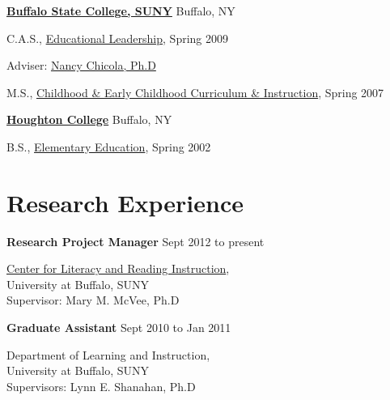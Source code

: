 \href{http://www.buffalostate.edu/}{\textbf{Buffalo State College, SUNY}}
Buffalo, NY
\begin{outerlist}

\item[] C.A.S.,
        \href{http://www.buffalostate.edu/gradprog.xml?bpid=27}
             {Educational Leadership},
             Spring 2009
        \begin{innerlist}
        \item Adviser:
              \href{http://elementaryeducation.buffalostate.edu/faculty/nancy-chicola}
                   {Nancy Chicola, Ph.D} 
        \end{innerlist}
\end{outerlist}
\vspace{.1in}

\begin{outerlist}

\item[] M.S.,
        \href{http://www.buffalostate.edu/gradprog.xml?bpid=27}
             {Childhood \& Early Childhood Curriculum \& Instruction},
             Spring 2007
\end{outerlist}
\vspace{.1in}

\href{http://www.houghton.edu/}{\textbf{Houghton College}}
Buffalo, NY
\begin{outerlist}

\item[] B.S.,
        \href{http://www.houghton.edu/education/}
             {Elementary Education},
             Spring 2002
\end{outerlist}
\vspace{.1in}


\section{Research Experience}

\textbf{Research Project Manager} \hfill {Sept 2012 to present}
\begin{innerlist}

\item[] \href{http://clari.buffalo.edu}{Center for Literacy and Reading Instruction},\\
        University at Buffalo, SUNY\\
        Supervisor: Mary M. McVee, Ph.D
\end{innerlist}

\textbf{Graduate Assistant} \hfill {Sept 2010 to Jan 2011}
\begin{innerlist}

\item[] Department of Learning and Instruction,\\
        University at Buffalo, SUNY\\
        Supervisors: Lynn E. Shanahan, Ph.D
\end{innerlist}

